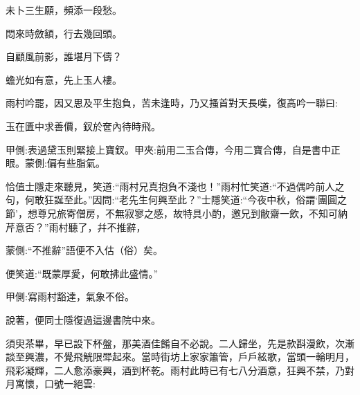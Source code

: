 \begin{poem}
    \begin{pl}未卜三生願，頻添一段愁。\end{pl}

    \begin{pl}悶來時斂額，行去幾回頭。\end{pl}

    \begin{pl}自顧風前影，誰堪月下儔？\end{pl}

    \begin{pl}蟾光如有意，先上玉人樓。\end{pl}
\end{poem}


\begin{parag}
    雨村吟罷，因又思及平生抱負，苦未逢時，乃又搔首對天長嘆，復高吟一聯曰:
\end{parag}


\begin{poem}
    \begin{pl}玉在匱中求善價，釵於奩內待時飛。\begin{note}甲側:表過黛玉則緊接上寶釵。甲夾:前用二玉合傳，今用二寶合傳，自是書中正眼。蒙側:偏有些脂氣。\end{note}\end{pl}\end{poem}


\begin{parag}
    恰值士隱走來聽見，笑道:“雨村兄真抱負不淺也！”雨村忙笑道:“不過偶吟前人之句，何敢狂誕至此。”因問:“老先生何興至此？”士隱笑道:“今夜中秋，俗謂‘團圓之節’，想尊兄旅寄僧房，不無寂寥之感，故特具小酌，邀兄到敝齋一飲，不知可納芹意否？”雨村聽了，幷不推辭，\begin{note}蒙側:“不推辭”語便不入估（俗）矣。\end{note}便笑道:“既蒙厚愛，何敢拂此盛情。”\begin{note}甲側:寫雨村豁達，氣象不俗。\end{note}說著，便同士隱復過這邊書院中來。
\end{parag}


\begin{parag}
    須臾茶畢，早已設下杯盤，那美酒佳餚自不必說。二人歸坐，先是款斟漫飲，次漸談至興濃，不覺飛觥限斝起來。當時街坊上家家簫管，戶戶絃歌，當頭一輪明月，飛彩凝輝，二人愈添豪興，酒到杯乾。雨村此時已有七八分酒意，狂興不禁，乃對月寓懷，口號一絕雲:
\end{parag}



